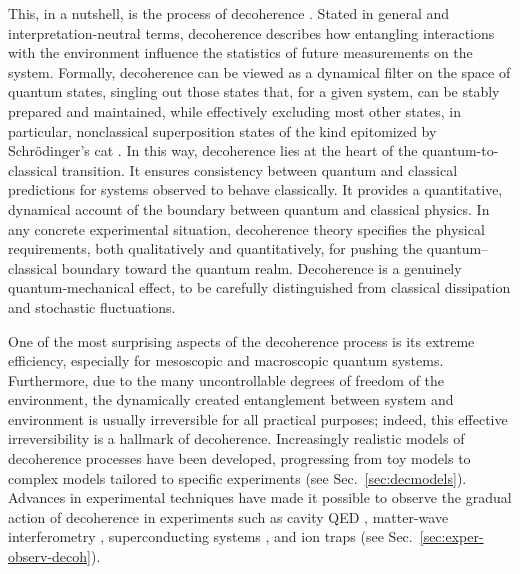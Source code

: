 \documentclass[3p,sort&compress,12pt]{elsarticle}
\begin{document}
This, in a nutshell, is the process of decoherence \cite{Zeh:1970:yt,Zurek:1981:dd,Zurek:1982:tv,Paz:2001:aa,Zurek:2002:ii,Schlosshauer:2003:tv,Bacciagaluppi:2003:yz,Joos:2003:jh,Schlosshauer:2007:un}. Stated in general and interpretation-neutral terms, decoherence describes how entangling interactions with the environment influence the statistics of future measurements on the system. Formally, decoherence can be viewed as a dynamical filter on the space of quantum states, singling out those states that, for a given system, can be stably prepared and maintained, while effectively excluding most other states, in particular, nonclassical superposition states of the kind epitomized by Schr\"odinger's cat \cite{Schrodinger:1935:gs}. In this way, decoherence lies at the heart of the quantum-to-classical transition. It ensures consistency between quantum and classical predictions for systems observed to behave classically. It provides a quantitative, dynamical account of the boundary between quantum and classical physics. In any concrete experimental situation, decoherence theory specifies the physical requirements, both qualitatively and quantitatively, for pushing the quantum--classical boundary toward the quantum realm. Decoherence is a genuinely quantum-mechanical effect, to be carefully distinguished from classical dissipation and stochastic fluctuations.

One of the most surprising aspects of the decoherence process is its extreme efficiency, especially for mesoscopic and macroscopic quantum systems. Furthermore, due to the many uncontrollable degrees of freedom of the environment, the dynamically created entanglement between system and environment is usually irreversible for all practical purposes; indeed, this effective irreversibility is a hallmark of decoherence. Increasingly realistic models of decoherence processes have been developed, progressing from toy models to complex models tailored to specific experiments (see Sec.~\ref{sec:decmodels}). Advances in experimental techniques have made it possible to observe the gradual action of decoherence in experiments such as cavity QED \cite{Raimond:2001:aa}, matter-wave interferometry \cite{Hornberger:2012:ii}, superconducting systems \cite{Leggett:2002:uy}, and ion traps \cite{Leibfried:2003:om,Haffner:2008:pp} (see Sec.~\ref{sec:exper-observ-decoh}). 
\end{document}
